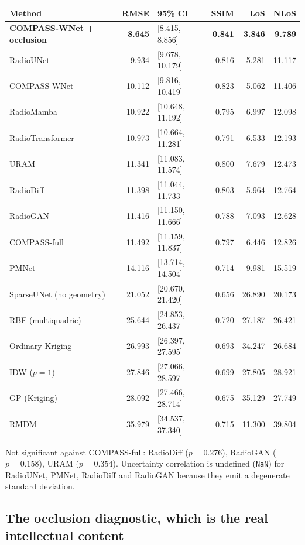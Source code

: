 \documentclass[10pt,a4paper]{article}
\begin{document}
\begin{center}\small
\begin{tabular}{@{}lrlrrr@{}}
\toprule
Method & RMSE & 95\% CI & SSIM & LoS & NLoS \\ \midrule
\rowcolor{green!8}\textbf{COMPASS-WNet + occlusion} & \textbf{8.645} & [8.415, 8.856] & \textbf{0.841} & \textbf{3.846} & \textbf{9.789} \\
RadioUNet & 9.934 & [9.678, 10.179] & 0.816 & 5.281 & 11.117 \\
COMPASS-WNet & 10.112 & [9.816, 10.419] & 0.823 & 5.062 & 11.406 \\
RadioMamba & 10.922 & [10.648, 11.192] & 0.795 & 6.997 & 12.098 \\
RadioTransformer & 10.973 & [10.664, 11.281] & 0.791 & 6.533 & 12.193 \\
URAM & 11.341 & [11.083, 11.574] & 0.800 & 7.679 & 12.473 \\
RadioDiff & 11.398 & [11.044, 11.733] & 0.803 & 5.964 & 12.764 \\
RadioGAN & 11.416 & [11.150, 11.666] & 0.788 & 7.093 & 12.628 \\
COMPASS-full & 11.492 & [11.159, 11.837] & 0.797 & 6.446 & 12.826 \\
PMNet & 14.116 & [13.714, 14.504] & 0.714 & 9.981 & 15.519 \\
SparseUNet (no geometry) & 21.052 & [20.670, 21.420] & 0.656 & 26.890 & 20.173 \\
RBF (multiquadric) & 25.644 & [24.853, 26.437] & 0.720 & 27.187 & 26.421 \\
Ordinary Kriging & 26.993 & [26.397, 27.595] & 0.693 & 34.247 & 26.684 \\
IDW ($p{=}1$) & 27.846 & [27.066, 28.597] & 0.699 & 27.805 & 28.921 \\
GP (Kriging) & 28.092 & [27.466, 28.714] & 0.675 & 35.129 & 27.749 \\
RMDM & 35.979 & [34.537, 37.340] & 0.715 & 11.300 & 39.804 \\
\bottomrule
\end{tabular}
\end{center}

Not significant against COMPASS-full: RadioDiff ($p=0.276$), RadioGAN ($p=0.158$),
URAM ($p=0.354$). Uncertainty correlation is undefined (\texttt{NaN}) for RadioUNet,
PMNet, RadioDiff and RadioGAN because they emit a degenerate standard deviation.

\subsection{The occlusion diagnostic, which is the real intellectual content}
\end{document}
